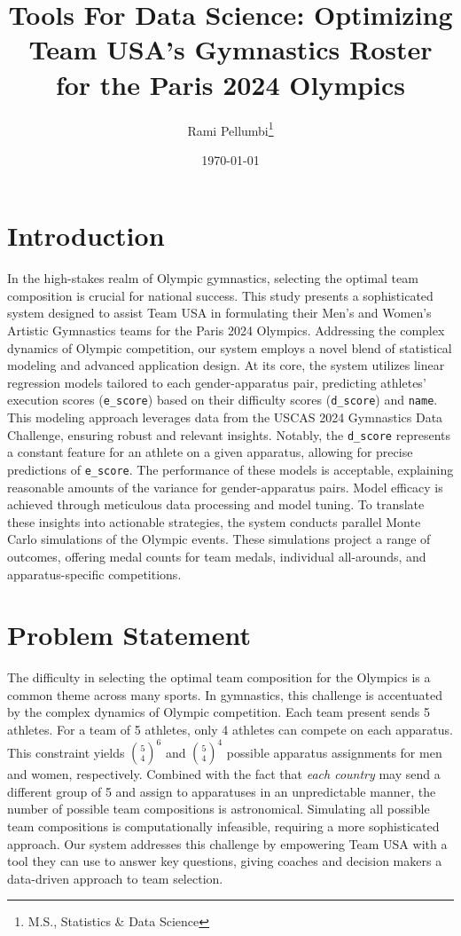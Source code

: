 \documentclass{article}
\title{Tools For Data Science: Optimizing Team USA's Gymnastics Roster for the Paris 2024 Olympics}
\author{Rami Pellumbi\thanks{M.S., Statistics \& Data Science}}
\date{\today}
\begin{document}
\maketitle
\newpage
\section{Introduction}
In the high-stakes realm of Olympic gymnastics, selecting the optimal team 
composition is crucial for national success. This study presents a 
sophisticated system designed to assist Team USA in formulating their Men's 
and Women's Artistic Gymnastics teams for the Paris 2024 Olympics. Addressing 
the complex dynamics of Olympic competition, our system employs a novel blend 
of statistical modeling and advanced application design. 
At its core, the system utilizes linear regression models tailored 
to each gender-apparatus pair, predicting athletes' execution scores (\texttt{e\_score}) 
based on their difficulty scores (\texttt{d\_score}) and \texttt{name}. 
This modeling approach leverages data from the USCAS 2024 Gymnastics Data 
Challenge, ensuring robust and relevant insights. Notably, 
the \texttt{d\_score} represents a constant feature for an athlete on a given 
apparatus, allowing for precise predictions of \texttt{e\_score}.
The performance of these models is acceptable, explaining 
reasonable amounts of the variance for gender-apparatus pairs. Model efficacy is 
achieved through meticulous data processing and model tuning.
To translate these insights into actionable strategies, the system 
conducts parallel Monte Carlo simulations of the Olympic events. These simulations 
project a range of outcomes, offering medal counts for team medals, 
individual all-arounds, and apparatus-specific competitions.

\section{Problem Statement}
The difficulty in selecting the optimal team composition for the Olympics 
is a common theme across many sports. In gymnastics, this challenge is 
accentuated by the complex dynamics of Olympic competition. Each team present 
sends 5 athletes. For a team of 5 athletes, only 4 athletes can compete on each apparatus. 
This constraint yields ${5 \choose 4}^6$ and ${5 \choose 4}^4$ possible apparatus assignments for 
men and women, respectively. Combined with the fact that \textit{each country} may 
send a different group of 5 and assign to apparatuses in an unpredictable manner, 
the number of possible team compositions is astronomical. 
Simulating all possible team compositions is computationally infeasible, 
requiring a more sophisticated approach. Our system addresses this challenge 
by empowering Team USA with a tool they can use to answer key questions, 
giving coaches and decision makers a data-driven approach to team selection.
\end{document}
